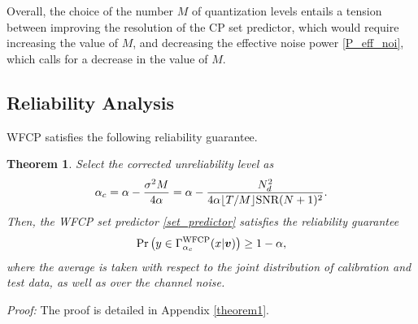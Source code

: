 \documentclass[12pt, draftclsnofoot, onecolumn]{IEEEtran}
\newtheorem{theorem}{Theorem}
\begin{document}
Overall, the choice of the number $M$ of quantization levels entails a tension between improving the resolution of the CP set predictor, which would require increasing the value of $M$, and decreasing the effective noise power \eqref{P_eff_noi}, which calls for a decrease in the value of $M$.

\subsection{Reliability Analysis}\label{sec:coverage_analysis}
WFCP satisfies the following reliability guarantee.
\begin{theorem}\label{theorem_corr_quan}
Select the corrected unreliability level as
    \begin{equation}\label{alphac}
        \alpha_c = \alpha - \frac{\sigma^2 M}{4 \alpha} = \alpha - \frac{N_d^2}{4\alpha \lfloor T/M\rfloor\text{\rm{SNR}}(N+1)^2}.
    \end{equation}
Then, the WFCP set predictor \eqref{set_predictor} satisfies the reliability guarantee
    \begin{equation}\label{cov_bound}
        \Pr\left(y \in \Gamma_{\alpha_c}^{\text{\rm{WFCP}}}(x|\boldsymbol{v})\right)\geq 1-\alpha,
    \end{equation}
where the average is taken with respect to the joint distribution of calibration and test data, as well as over the channel noise.
\end{theorem}
\textit{Proof:} The proof is detailed in Appendix \ref{theorem1}.
\end{document}
